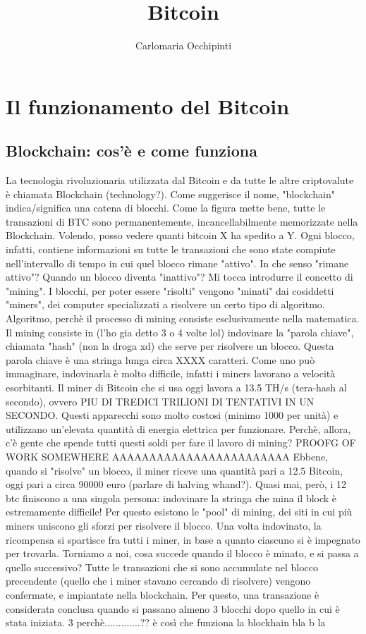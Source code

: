 \documentclass {article}
\title {Bitcoin}
\author {Carlomaria Occhipinti}
\begin{document}
\maketitle
\tableofcontents
{}
\newpage
{}

\section {Il funzionamento del Bitcoin}

\subsection {Blockchain: cos'è e come funziona}

	
La tecnologia rivoluzionaria utilizzata dal Bitcoin e da tutte le altre criptovalute è chiamata Blockchain (technology?).
Come suggerisce il nome, "blockchain" indica/significa una catena di blocchi.
Come la figura mette bene, tutte le transazioni di BTC sono permanentemente, incancellabilmente memorizzate nella Blockchain.
Volendo, posso vedere quanti bitcoin X ha spedito a Y. Ogni blocco, infatti, contiene informazioni su tutte le transazioni che sono state compiute nell'intervallo di tempo in cui quel blocco rimane "attivo".
In che senso "rimane attivo"? Quando un blocco diventa "inattivo"?
Mi tocca introdurre il concetto di "mining".
I blocchi, per poter essere "risolti" vengono "minati" dai cosiddetti "miners", dei computer specializzati a risolvere un certo tipo di algoritmo.
Algoritmo, perchè il processo di mining consiste esclusivamente nella matematica.
Il mining consiste in (l'ho gia detto 3 o 4 volte lol) indovinare la "parola chiave", chiamata "hash" (non la droga xd) che serve per risolvere un blocco.
Questa parola chiave è una stringa lunga circa XXXX caratteri.
Come uno può immaginare, indovinarla è molto difficile, infatti i miners lavorano a velocità esorbitanti.
Il miner di Bitcoin che si usa oggi lavora a 13.5 TH/s (tera-hash al secondo), ovvero PIU DI TREDICI TRILIONI DI TENTATIVI IN UN SECONDO.
Questi apparecchi sono molto costosi (minimo 1000 per unità) e utilizzano un'elevata quantità di energia elettrica per funzionare.
Perchè, allora, c'è gente che spende tutti questi soldi per fare il lavoro di mining? PROOFG  OF WORK SOMEWHERE AAAAAAAAAAAAAAAAAAAAAAAA
Ebbene, quando si "risolve" un blocco, il miner riceve una quantità pari a 12.5 Bitcoin, oggi pari a circa 90000 euro (parlare di halving whand?). Quasi mai, però, i 12 btc finiscono a una singola persona: indovinare la stringa che mina il block è estremamente difficile! Per questo esistono le "pool" di mining, dei siti in cui più miners uniscono gli sforzi per risolvere il blocco. Una volta indovinato, la ricompensa si spartisce fra tutti i miner, in base a quanto ciascuno si è impegnato per trovarla.
Torniamo a noi, cosa succede quando il blocco è minato, e si passa a quello successivo? Tutte le transazioni che si sono accumulate nel blocco precendente (quello che i miner stavano cercando di risolvere) vengono confermate, e impiantate nella blockchain. Per questo, una transazione è considerata conclusa quando si passano almeno 3 blocchi dopo quello in cui è stata iniziata.
3 perchè.............??
è così che funziona la blockhain bla b la
\end{document}
